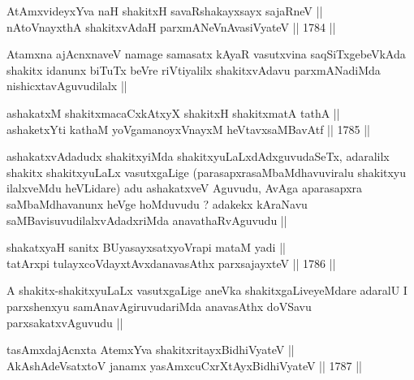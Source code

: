 

\begin{shl}
AtAmxvideyxYva naH shakitxH savaRshakayxsayx sajaRneV || \\
nAtoV\s nayxthA shakitxvAdaH parxmANeVnAvasiVyateV ||  1784 ||  
\end{shl}

\begin{artha}
Atamxna ajAcnxnaveV namage samasatx kAyaR vasutxvina saqSiTxgebeVkAda
shakitx idanunx biTuTx beVre riVtiyalilx shakitxvAdavu parxmANadiMda
nishicxtavAguvudilalx ||
\end{artha}


\begin{shl}
ashakatxM shakitxmacaCxkAtxyX shakitxH shakitxmatA tathA || \\
ashaketxYti kathaM yoVgamanoyxVnayxM heVtavxsaMBavAtf ||  1785 ||  
\end{shl}

\begin{artha}
ashakatxvAdadudx shakitxyiMda shakitxyuLaLxdAdxguvudaSeTx, adaralilx
shakitx shakitxyuLaLx vasutxgaLige (parasapxrasaMbaMdhavuviralu
shakitxyu ilalxveMdu heVLidare) adu ashakatxveV Aguvudu, AvAga
aparasapxra saMbaMdhavanunx heVge hoMduvudu ? adakekx kAraNavu
saMBavisuvudilalxvAdadxriMda anavathaRvAguvudu ||
\end{artha}


\begin{shl}
shakatxyaH sanitx BUyasayxsatxyoVrapi mataM yadi || \\
tatArxpi tulayxcoVdayxtAvxdanavasAthx parxsajayxteV ||  1786 || 
\end{shl}

\begin{artha}
A shakitx-shakitxyuLaLx vasutxgaLige aneVka shakitxgaLiveyeMdare
adaralU I parxshenxyu samAnavAgiruvudariMda anavasAthx doVSavu
parxsakatxvAguvudu ||
\end{artha}


\begin{shl}
tasAmxdajAcnxta AtemxYva shakitxritayxBidhiVyateV || \\
AkAshAdeVsatxtoV janamx yasAmxcuCxrXtAyx\s BidhiVyateV ||  1787 ||  
\end{shl}

